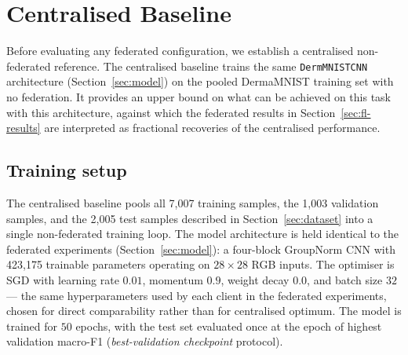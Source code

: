 %
%
%

\section{Centralised Baseline}
\label{sec:centralised-baseline}

Before evaluating any federated configuration, we establish a
centralised non-federated reference. The centralised baseline trains
the same \texttt{DermMNISTCNN} architecture
(Section~\ref{sec:model}) on the pooled DermaMNIST training set with
no federation. It provides an upper bound on what can be achieved on
this task with this architecture, against which the federated
results in Section~\ref{sec:fl-results} are interpreted as
fractional recoveries of the centralised performance.

\subsection{Training setup}
\label{sec:centralised-setup}

The centralised baseline pools all 7{,}007 training samples, the
1{,}003 validation samples, and the 2{,}005 test samples described
in Section~\ref{sec:dataset} into a single non-federated training
loop. The model architecture is held identical to the federated
experiments (Section~\ref{sec:model}): a four-block GroupNorm CNN
with 423{,}175 trainable parameters operating on $28\times28$ RGB
inputs. The optimiser is SGD with learning rate $0.01$, momentum
$0.9$, weight decay $0.0$, and batch size $32$ --- the same
hyperparameters used by each client in the federated experiments,
chosen for direct comparability rather than for centralised
optimum. The model is trained for $50$ epochs, with the test set
evaluated once at the epoch of highest validation macro-F1
(\emph{best-validation checkpoint} protocol).

